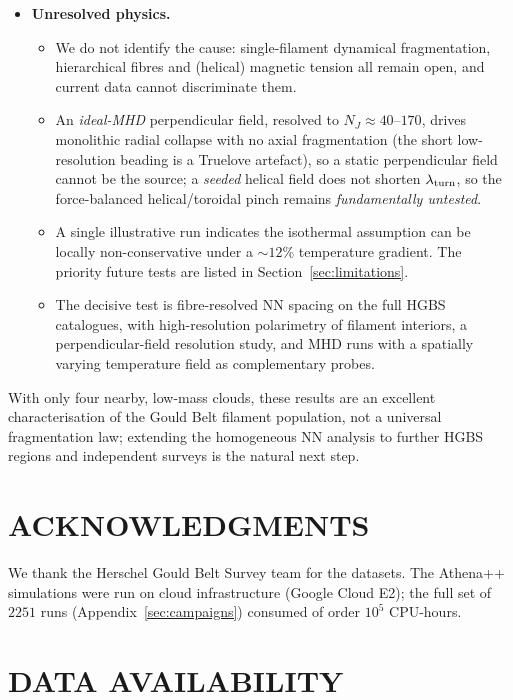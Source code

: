 \documentclass[usenatbib,twoside,twocolumn]{mnras}
\begin{document}
\begin{itemize}
    \item \textbf{Unresolved physics.}
    \begin{itemize}
        \item We do not identify the cause: single-filament dynamical fragmentation, hierarchical fibres and (helical) magnetic tension all remain open, and current data cannot discriminate them.
        \item An \emph{ideal-MHD} perpendicular field, resolved to $N_J\approx40$--$170$, drives monolithic radial collapse with no axial fragmentation (the short low-resolution beading is a Truelove artefact), so a static perpendicular field cannot be the source; a \emph{seeded} helical field does not shorten $\lambda_{\rm turn}$, so the force-balanced helical/toroidal pinch remains \emph{fundamentally untested}.
        \item A single illustrative run indicates the isothermal assumption can be locally non-conservative under a $\sim12\%$ temperature gradient. The priority future tests are listed in Section~\ref{sec:limitations}.
        \item The decisive test is fibre-resolved NN spacing on the full HGBS catalogues, with high-resolution polarimetry of filament interiors, a perpendicular-field resolution study, and MHD runs with a spatially varying temperature field as complementary probes.
    \end{itemize}
    \end{itemize}

\smallskip\noindent With only four nearby, low-mass clouds, these results are an excellent characterisation of the Gould Belt filament population, not a universal fragmentation law; extending the homogeneous NN analysis to further HGBS regions and independent surveys is the natural next step.

\section*{ACKNOWLEDGMENTS}

We thank the Herschel Gould Belt Survey team for the datasets. The Athena++ simulations were run on cloud infrastructure (Google Cloud E2); the full set of $2251$ runs (Appendix~\ref{sec:campaigns}) consumed of order $10^5$ CPU-hours.

\section*{DATA AVAILABILITY}
\end{document}
